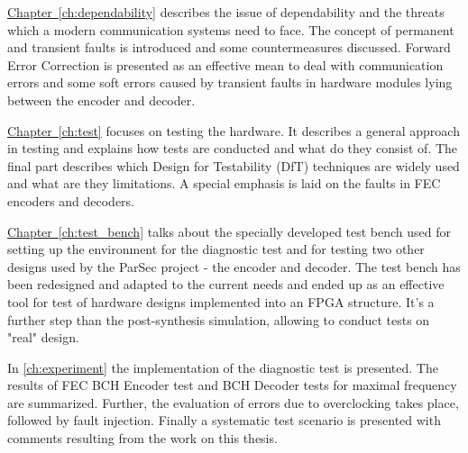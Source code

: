 \hyperref[ch:dependability]{Chapter~\ref*{ch:dependability}} describes the issue of dependability and the threats which a modern communication systems need to face. The concept of permanent and transient faults is introduced and some countermeasures discussed. Forward Error Correction is presented as an effective mean to deal with communication errors and some soft errors caused by transient faults in hardware modules lying between the encoder and decoder.

\hyperref[ch:test]{Chapter~\ref*{ch:test}} focuses on testing the hardware. It describes a general approach in testing and explains how tests are conducted and what do they consist of. The final part describes which Design for Testability (DfT) techniques are widely used and what are they limitations. A special emphasis is laid on the faults in FEC encoders and decoders.

\hyperref[ch:test_bench]{Chapter~\ref*{ch:test_bench}} talks about the specially developed test bench used for setting up the environment for the diagnostic test and for testing two other designs used by the ParSec project - the encoder and decoder. The test bench has been redesigned and adapted to the current needs and ended up as an effective tool for test of hardware designs implemented into an FPGA structure. It's a further step than the post-synthesis simulation, allowing to conduct tests on "real" design.

In \autoref{ch:experiment} the implementation of the diagnostic test is presented. The results of FEC BCH Encoder test and BCH Decoder tests for maximal frequency are summarized. Further, the evaluation of errors due to overclocking takes place, followed by fault injection. Finally a systematic test scenario is presented with comments resulting from the work on this thesis.




